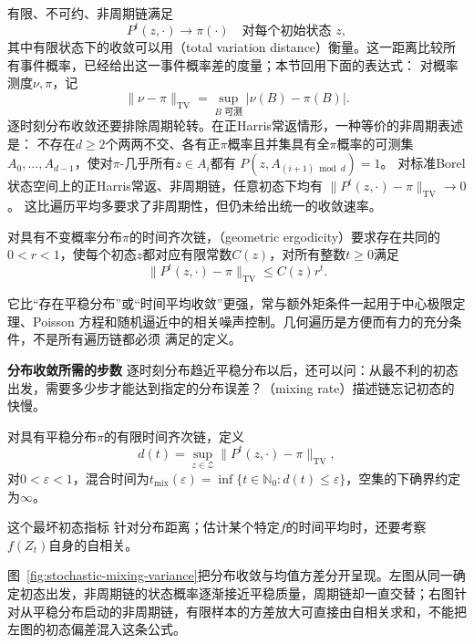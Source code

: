 有限、不可约、非周期链满足
\begin{equation}
  P^t(z,\cdot)\longrightarrow\pi(\cdot)
  \quad\text{对每个初始状态 }z,
  \label{eq:stoch-finite-chain-distribution-convergence}
\end{equation}
其中有限状态下的收敛可以用（total variation distance）衡量。这一距离比较所有事件概率，已经给出这一事件概率差的度量；本节回用下面的表达式：
对概率测度$\nu,\pi$，记
\[
  \lVert\nu-\pi\rVert_{\mathrm{TV}}
  =
  \sup_{B\text{ 可测}}|\nu(B)-\pi(B)|.
\]
逐时刻分布收敛还要排除周期轮转。在正Harris常返情形，一种等价的非周期表述是：
不存在\(d\geq2\)个两两不交、各有正\(\pi\)概率且并集具有全\(\pi\)概率的可测集
\(A_0,\ldots,A_{d-1}\)，使对\(\pi\)-几乎所有\(z\in A_i\)都有
\(P(z,A_{(i+1)\bmod d})=1\)。
对标准Borel状态空间上的正Harris常返、非周期链，任意初态下均有
\(\|P^t(z,\cdot)-\pi\|_{\mathrm{TV}}\to0\)。
这比遍历平均多要求了非周期性，但仍未给出统一的收敛速率。

\begin{definition}[几何遍历性]
  \label{def:stoch-geometric-ergodicity}
  对具有不变概率分布\(\pi\)的时间齐次链，（geometric ergodicity）要求存在共同的$0<r<1$，使每个初态\(z\)都对应有限常数$C(z)$，对所有整数\(t\geq0\)满足
\[
  \lVert P^t(z,\cdot)-\pi\rVert_{\mathrm{TV}}
  \leq C(z)r^t.
\]
\end{definition}
它比“存在平稳分布”或“时间平均收敛”更强，常与额外矩条件一起用于中心极限定理、Poisson
方程和随机逼近中的相关噪声控制。几何遍历是方便而有力的充分条件，不是所有遍历链都必须
满足的定义。

\par\medskip\noindent\textbf{分布收敛所需的步数}\quad
逐时刻分布趋近平稳分布以后，还可以问：从最不利的初态出发，需要多少步才能达到指定的分布误差？（mixing rate）描述链忘记初态的快慢。
\begin{definition}[有限链的混合时间]
  \label{def:stoch-finite-mixing-time}
对具有平稳分布\(\pi\)的有限时间齐次链，定义
\[
  d(t)
  =
  \sup_{z\in\mathcal{Z}}
  \lVert P^t(z,\cdot)-\pi\rVert_{\mathrm{TV}},
\]
对\(0<\varepsilon<1\)，混合时间为\(t_{\mathrm{mix}}(\varepsilon)=\inf\{t\in\mathbb N_0:d(t)\leq\varepsilon\}\)，空集的下确界约定为\(\infty\)。
\end{definition}
这个最坏初态指标
针对分布距离；估计某个特定$f$的时间平均时，还要考察$f(Z_t)$自身的自相关。

图~\ref{fig:stochastic-mixing-variance}把分布收敛与均值方差分开呈现。左图从同一确定初态出发，非周期链的状态概率逐渐接近平稳质量，周期链却一直交替；右图针对从平稳分布启动的非周期链，有限样本的方差放大可直接由自相关求和，不能把左图的初态偏差混入这条公式。

